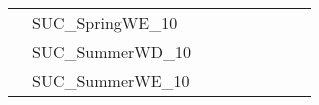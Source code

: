 \begin{table}[]
{\begin{tabular}{|c|l|ll|ll|l|l|l|}
			& SUC\_SpringWE\_10             &                                 &                                &                                  &                                 &                                    &                            &                            \\
			& SUC\_SummerWD\_10             &                                 &                                &                                  &                                 &                                    &                            &                            \\
			& SUC\_SummerWE\_10             &                                 &                                &                                  &                                 &                                    &                            &                            \\ \hline
		\end{tabular}%
	}
\end{table}